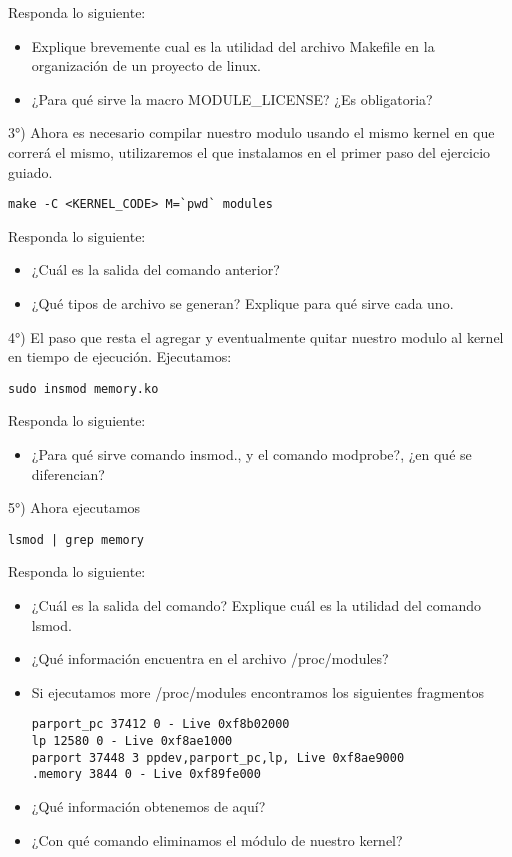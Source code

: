 Responda lo siguiente:
\begin{itemize}  
\item Explique brevemente cual es la utilidad del archivo Makefile en la organización de un proyecto de linux.
\item ¿Para qué sirve la macro MODULE\_LICENSE? ¿Es obligatoria?
\end{itemize} 

3°) Ahora es necesario compilar nuestro modulo usando el mismo kernel en que correrá el mismo, utilizaremos el que instalamos en el primer paso del ejercicio guiado.

\begin{verbatim}
make -C <KERNEL_CODE> M=`pwd` modules
\end{verbatim}


Responda lo siguiente:
\begin{itemize}  
\item ¿Cuál es la salida del comando anterior? 
\item ¿Qué tipos de archivo se generan? Explique para qué sirve cada uno.
\end{itemize}  


4°) El paso que resta el agregar y eventualmente quitar nuestro modulo al kernel en tiempo de ejecución. Ejecutamos:
\begin{verbatim}
sudo insmod memory.ko
\end{verbatim}

Responda lo siguiente:
\begin{itemize}  
\item ¿Para qué sirve comando insmod., y el comando modprobe?, ¿en qué se diferencian?
\end{itemize}  

5°)  Ahora ejecutamos 
\begin{verbatim}
lsmod | grep memory
\end{verbatim}

Responda lo siguiente:
\begin{itemize}  
\item ¿Cuál es la salida del comando? Explique cuál es la utilidad del comando lsmod.
\item ¿Qué información encuentra en el archivo /proc/modules?
\item Si ejecutamos more /proc/modules encontramos los siguientes fragmentos

\begin{verbatim}
parport_pc 37412 0 - Live 0xf8b02000
lp 12580 0 - Live 0xf8ae1000
parport 37448 3 ppdev,parport_pc,lp, Live 0xf8ae9000
.memory 3844 0 - Live 0xf89fe000
\end{verbatim}

\item ¿Qué información obtenemos de aquí?
\item ¿Con qué comando eliminamos el módulo de nuestro kernel?
\end{itemize}  

